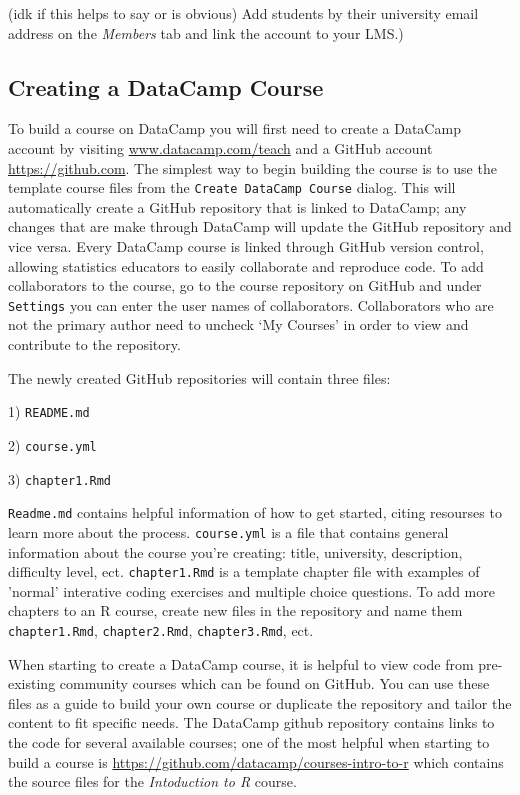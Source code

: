 \documentclass[12pt]{article}
\begin{document}
(idk if this helps to say or is obvious) Add students by their university email address on the \textit{Members} tab and link the account to your LMS.)



\subsection{Creating a DataCamp Course}
To build a course on DataCamp you will first need to create a DataCamp account by visiting \url{www.datacamp.com/teach} and
a GitHub account \url{https://github.com}. The simplest way to begin building the course is to use the template course files from the 
\texttt{Create DataCamp Course} dialog. This will automatically create a GitHub repository that is linked to DataCamp; any changes that are
make through DataCamp will update the GitHub repository and vice versa. Every DataCamp course is linked through GitHub version control,
allowing statistics educators to easily collaborate and reproduce code. To add collaborators to the course, go to the course repository
on GitHub and under \texttt{Settings} you can enter the user names of collaborators. Collaborators who are not the primary author need 
to uncheck `My Courses' in order to view and contribute to the repository.



The newly created GitHub repositories will contain three files: 

1) \texttt{README.md}

2) \texttt{course.yml}

3) \texttt{chapter1.Rmd}


\texttt{Readme.md} contains helpful information of how to get started, citing resourses to learn more about the process.
\texttt{course.yml} is a file that contains general information about the course you're creating: title, university, description,
difficulty level, ect.
\texttt{chapter1.Rmd} is a template chapter file with examples of 'normal' interative coding exercises and multiple choice questions.
To add more chapters to an R course, create new files in the repository and name them \texttt{chapter1.Rmd}, \texttt{chapter2.Rmd},
\texttt{chapter3.Rmd}, ect.

When starting to create a DataCamp course, it is helpful to view code from pre-existing community courses which can be found on GitHub.
You can use these files as a guide to build your own course or duplicate the repository and tailor the content to fit specific needs.
The DataCamp github repository contains links to the code for several available courses; one of the most helpful when starting to build a course 
is \url{https://github.com/datacamp/courses-intro-to-r} which contains the source files for the \textit{Intoduction to R} course.
\end{document}
